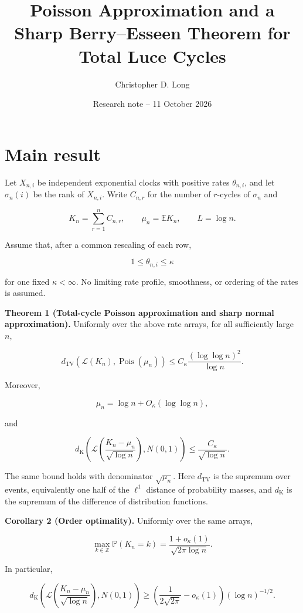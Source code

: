 \documentclass[
  11pt,
]{article}
\title{Poisson Approximation and a Sharp Berry--Esseen Theorem for Total
Luce Cycles}
\author{Christopher D. Long}
\date{Research note -- 11 October 2026}
\begin{document}
\maketitle

\section{Main result}\label{main-result}

Let \(X_{n,i}\) be independent exponential clocks with positive rates
\(\theta_{n,i}\), and let \(\sigma_n(i)\) be the rank of \(X_{n,i}\).
Write \(C_{n,r}\) for the number of \(r\)-cycles of \(\sigma_n\) and

\[
K_n=\sum_{r=1}^n C_{n,r},\qquad \mu_n=\mathbb E K_n,\qquad L=\log n.
\]

Assume that, after a common rescaling of each row,

\[
1\le\theta_{n,i}\le\kappa
\]

for one fixed \(\kappa<\infty\). No limiting rate profile, smoothness,
or ordering of the rates is assumed.

\textbf{Theorem 1 (Total-cycle Poisson approximation and sharp normal
approximation).} Uniformly over the above rate arrays, for all
sufficiently large \(n\),

\[
\boxed{
 d_{\mathrm{TV}}\!\left(\mathcal L(K_n),\operatorname{Pois}(\mu_n)\right)
 \le C_\kappa\frac{(\log\log n)^2}{\log n}.}
\tag{1}
\]

Moreover,

\[
\mu_n=\log n+O_\kappa(\log\log n),
\tag{2}
\]

and

\[
\boxed{
 d_{\mathrm K}\!\left(
 \mathcal L\!\left(\frac{K_n-\mu_n}{\sqrt{\log n}}\right),
 N(0,1)\right)
 \le\frac{C_\kappa}{\sqrt{\log n}}.}
\tag{3}
\]

The same bound holds with denominator \(\sqrt{\mu_n}\). Here
\(d_{\mathrm{TV}}\) is the supremum over events, equivalently one half
of the \(\ell^1\) distance of probability masses, and \(d_{\mathrm K}\)
is the supremum of the difference of distribution functions.

\textbf{Corollary 2 (Order optimality).} Uniformly over the same arrays,

\[
\max_{k\in\mathbb Z}\mathbb P(K_n=k)
=\frac{1+o_\kappa(1)}{\sqrt{2\pi\log n}}.
\tag{4}
\]

In particular,

\[
 d_{\mathrm K}\!\left(
 \mathcal L\!\left(\frac{K_n-\mu_n}{\sqrt{\log n}}\right),N(0,1)\right)
 \ge
 \left(\frac1{2\sqrt{2\pi}}-o_\kappa(1)\right)(\log n)^{-1/2}.
\tag{5}
\]
\end{document}
